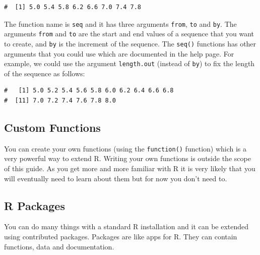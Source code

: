 \documentclass[a4paper,9pt,twocolumn,twoside,printwatermark=false]{pinp}
\begin{document}
\begin{ShadedResult}
\begin{verbatim}
#  [1] 5.0 5.4 5.8 6.2 6.6 7.0 7.4 7.8
\end{verbatim}
\end{ShadedResult}

The function name is \texttt{seq} and it has three arguments
\texttt{from}, \texttt{to} and \texttt{by}. The arguments \texttt{from}
and \texttt{to} are the start and end values of a sequence that you want
to create, and \texttt{by} is the increment of the sequence. The
\texttt{seq()} functions has other arguments that you could use which
are documented in the help page. For example, we could use the argument
\texttt{length.out} (instead of \texttt{by}) to fix the length of the
sequence as follows:

\begin{Shaded}
\begin{Highlighting}[]
\NormalTok{(} \NormalTok{, } \NormalTok{, } \NormalTok{)}
\end{Highlighting}
\end{Shaded}

\begin{ShadedResult}
\begin{verbatim}
#   [1] 5.0 5.2 5.4 5.6 5.8 6.0 6.2 6.4 6.6 6.8
#  [11] 7.0 7.2 7.4 7.6 7.8 8.0
\end{verbatim}
\end{ShadedResult}

\subsection{Custom Functions}\label{custom-functions}

You can create your own functions (using the \texttt{function()}
function) which is a very powerful way to extend R. Writing your own
functions is outside the scope of this guide. As you get more and more
familiar with R it is very likely that you will eventually need to learn
about them but for now you don't need to.

\subsection{R Packages}\label{r-packages}

You can do many things with a standard R installation and it can be
extended using contributed packages. Packages are like apps for R. They
can contain functions, data and documentation.
\end{document}
